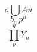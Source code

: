 \begin{equation}  \sigma \bigcup Au \end{equation}
\begin{equation}b_a \, p^n\end{equation}
\begin{equation}\prod_p^q Y_n\end{equation}
